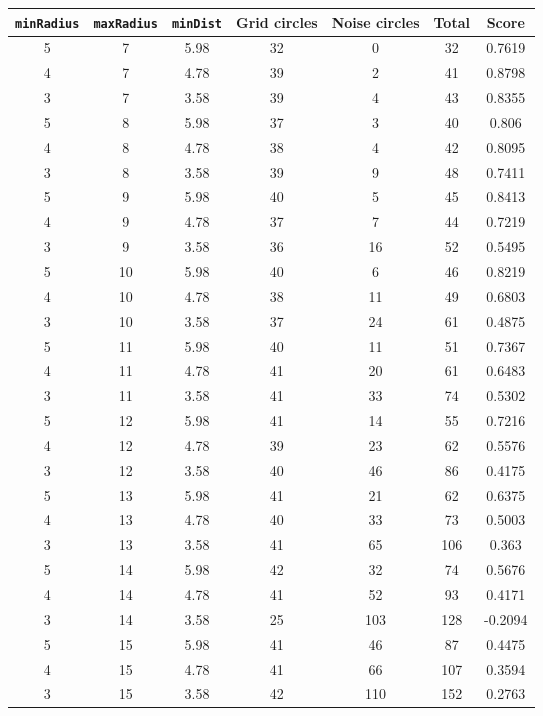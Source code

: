 \documentclass[letterpaper, 12pt]{article}
\begin{document}
\begin{longtable}{|c|c|c|c|c|c|c|}
\hline
\textbf{\texttt{minRadius}} & \textbf{\texttt{maxRadius}} & \textbf{\texttt{minDist}} & \textbf{Grid circles} & \textbf{Noise circles} & \textbf{Total} & \textbf{Score} \\
\hline
5 & 7 & 5.98 & 32 & 0 & 32 & 0.7619 \\
\hline
4 & 7 & 4.78 & 39 & 2 & 41 & 0.8798 \\
\hline
3 & 7 & 3.58 & 39 & 4 & 43 & 0.8355 \\
\hline
5 & 8 & 5.98 & 37 & 3 & 40 & 0.806 \\
\hline
4 & 8 & 4.78 & 38 & 4 & 42 & 0.8095 \\
\hline
3 & 8 & 3.58 & 39 & 9 & 48 & 0.7411 \\
\hline
5 & 9 & 5.98 & 40 & 5 & 45 & 0.8413 \\
\hline
4 & 9 & 4.78 & 37 & 7 & 44 & 0.7219 \\
\hline
3 & 9 & 3.58 & 36 & 16 & 52 & 0.5495 \\
\hline
5 & 10 & 5.98 & 40 & 6 & 46 & 0.8219 \\
\hline
4 & 10 & 4.78 & 38 & 11 & 49 & 0.6803 \\
\hline
3 & 10 & 3.58 & 37 & 24 & 61 & 0.4875 \\
\hline
5 & 11 & 5.98 & 40 & 11 & 51 & 0.7367 \\
\hline
4 & 11 & 4.78 & 41 & 20 & 61 & 0.6483 \\
\hline
3 & 11 & 3.58 & 41 & 33 & 74 & 0.5302 \\
\hline
5 & 12 & 5.98 & 41 & 14 & 55 & 0.7216 \\
\hline
4 & 12 & 4.78 & 39 & 23 & 62 & 0.5576 \\
\hline
3 & 12 & 3.58 & 40 & 46 & 86 & 0.4175 \\
\hline
5 & 13 & 5.98 & 41 & 21 & 62 & 0.6375 \\
\hline
4 & 13 & 4.78 & 40 & 33 & 73 & 0.5003 \\
\hline
3 & 13 & 3.58 & 41 & 65 & 106 & 0.363 \\
\hline
5 & 14 & 5.98 & 42 & 32 & 74 & 0.5676 \\
\hline
4 & 14 & 4.78 & 41 & 52 & 93 & 0.4171 \\
\hline
3 & 14 & 3.58 & 25 & 103 & 128 & -0.2094 \\
\hline
5 & 15 & 5.98 & 41 & 46 & 87 & 0.4475 \\
\hline
4 & 15 & 4.78 & 41 & 66 & 107 & 0.3594 \\
\hline
3 & 15 & 3.58 & 42 & 110 & 152 & 0.2763 \\

\end{longtable}
\end{document}
